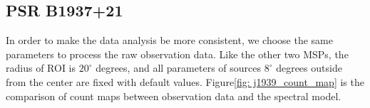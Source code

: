 \documentclass[12pt]{report}
\newcommand{\mycaption}[1]{\caption{\textit{\footnotesize #1}}}
\begin{document}
      
        \subsection{PSR B1937+21}
          In order to make the data analysis be more consistent, we choose the same parameters
          to process the raw observation data. Like the other two MSPs, the radius of ROI is $20^{\circ}$ 
          degrees, and all parameters of sources $8^{\circ}$ degrees outside from the center 
          are fixed with default values. Figure\ref{fig: j1939_count_map} is the 
          comparison of count maps between observation data and the spectral model. 
\end{document}
